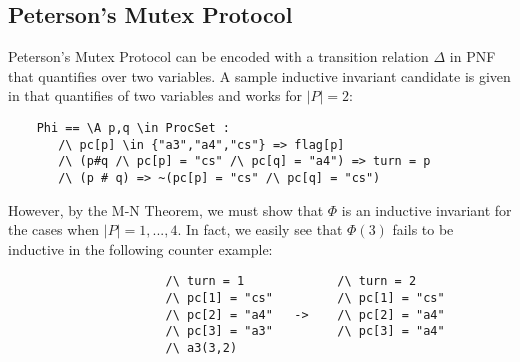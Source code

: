 \documentclass[12pt]{article}
\theoremstyle{definition}
\theoremstyle{remark}
\begin{document}
\subsection{Peterson's Mutex Protocol}
Peterson's Mutex Protocol can be encoded with a transition relation $\Delta$ in PNF that quantifies over two variables.  A sample inductive invariant candidate is given in \cite{ian-peterson} that quantifies of two variables and works for $|P|=2$:
\begin{verbatim}
    Phi == \A p,q \in ProcSet :
       /\ pc[p] \in {"a3","a4","cs"} => flag[p]
       /\ (p#q /\ pc[p] = "cs" /\ pc[q] = "a4") => turn = p
       /\ (p # q) => ~(pc[p] = "cs" /\ pc[q] = "cs")
\end{verbatim}
However, by the M-N Theorem, we must show that $\Phi$ is an inductive invariant for the cases when $|P|=1,...,4$.  In fact, we easily see that $\Phi(3)$ fails to be inductive in the following counter example:
\begin{verbatim}
                      /\ turn = 1             /\ turn = 2
                      /\ pc[1] = "cs"         /\ pc[1] = "cs"
                      /\ pc[2] = "a4"   ->    /\ pc[2] = "a4"
                      /\ pc[3] = "a3"         /\ pc[3] = "a4"
                      /\ a3(3,2)
\end{verbatim}




\end{document}
